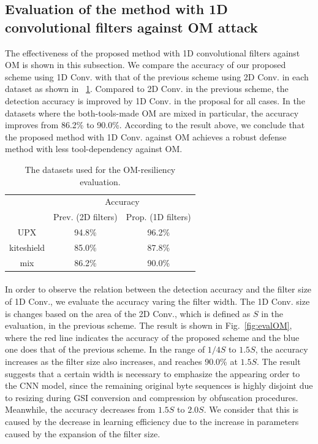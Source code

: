 \documentclass{ieeeaccess}
\newcommand{\myfigurename}{Fig.}
\begin{document}
\subsection{Evaluation of the method with 1D convolutional filters against OM attack}
The effectiveness of the proposed method with 1D convolutional filters against OM is shown in this subsection.
We compare the accuracy of our proposed scheme using 1D Conv. with that of the previous scheme using 2D Conv. in each dataset as shown in \tablename~\ref{tab:evalOM}.
Compared to 2D Conv. in the previous scheme, the detection accuracy is improved by 1D Conv. in the proposal for all cases.
In the datasets where the both-tools-made OM are mixed in particular, the accuracy improves from 86.2\% to 90.0\%.
According to the result above, we conclude that the proposed method with 1D Conv. against OM achieves a robust defense method with less tool-dependency against OM.
\begin{table}[h]
  \begin{center}
    \caption{The datasets used for the OM-resiliency evaluation.}
    \label{tab:evalOM} 
    \begin{tabular}{|c|c|c|} \hline
      \multirow{2}{*}{\hfill  \hfill} & \multicolumn{2}{c|}{Accuracy}  \\ \cline{2-3} 
					     & Prev. (2D filters) & Prop. (1D filters) \\ \hline \hline
      UPX & 94.8\% & 96.2\% \\ \cline{1-3} 
      kiteshield & 85.0\% & 87.8\% \\ \cline{1-3} 
      mix & 86.2\% & 90.0\% \\ \cline{1-3} 
  \end{tabular}
  \end{center}
\end{table}

\paragraph*{}
In order to observe the relation between the detection accuracy and the filter size of 1D Conv., we evaluate the accuracy varing the filter width.
The 1D Conv. size is changes based on the area of the 2D Conv., which is defined as $S$ in the evaluation, in the previous scheme.
The result is shown in \myfigurename~\ref{fig:evalOM}, where the red line indicates the accuracy of the proposed scheme and the blue one does that of the previous scheme.
In the range of $1/4S$ to $1.5S$, the accuracy increases as the filter size also increases, and reaches 90.0\% at $1.5S$.
The result suggests that a certain width is necessary to emphasize the appearing order to the CNN model, since the remaining original byte sequences is highly disjoint due to resizing during GSI conversion and compression by obfuscation procedures.
Meanwhile, the accuracy decreases from $1.5S$ to $2.0S$.
We consider that this is caused by the decrease in learning efficiency due to the increase in parameters caused by the expansion of the filter size.
\end{document}
